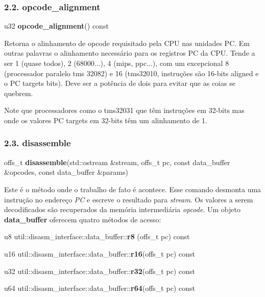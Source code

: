 \documentclass[letterpaper,10pt,brazil]{sphinxmanual}
\begin{document}
\subsubsection{2.2. opcode\_alignment}
\label{techspecs/device_disasm_interface:opcode-alignment}
\begin{DUlineblock}{0em}
\item[] u32 \textbf{opcode\_alignment}() const
\end{DUlineblock}

Retorna o alinhamento de opcode requisitado pela CPU nas unidades PC.
Em outras palavras o alinhamento necessário para os registros PC
da CPU.
Tende a ser 1 (quase todos), 2 (68000...), 4 (mips, ppc...),
com um excepcional 8 (processador paralelo tms 32082) e 16
(tms32010, instruções são 16-bits aligned e o PC targets bits).
Deve ser a potência de dois para evitar que as coias se quebrem.

Note que processadores como o tms32031 que têm instruções em 32-bits
mas onde os valores PC targets em 32-bits têm um alinhamento de 1.


\subsubsection{2.3. disassemble}
\label{techspecs/device_disasm_interface:disassemble}
\begin{DUlineblock}{0em}
\item[] offs\_t \textbf{disassemble}(std::ostream \&stream, offs\_t pc, const data\_buffer \&opcodes, const data\_buffer \&params)
\end{DUlineblock}

Este é o método onde o trabalho de fato é acontece. Esse comando
desmonta uma instrução no endereço \emph{PC} e escreve o resultado para
\emph{stream}. Os valores a serem decodificados são recuperados
da memória intermediária \emph{opcode}. Um objeto \textbf{data\_buffer} oferecem
quatro métodos de acesso:

\begin{DUlineblock}{0em}
\item[] u8  util::disasm\_interface::data\_buffer::\textbf{r8} (offs\_t pc) const
\item[] u16 util::disasm\_interface::data\_buffer::\textbf{r16}(offs\_t pc) const
\item[] u32 util::disasm\_interface::data\_buffer::\textbf{r32}(offs\_t pc) const
\item[] u64 util::disasm\_interface::data\_buffer::\textbf{r64}(offs\_t pc) const
\end{DUlineblock}
\end{document}

